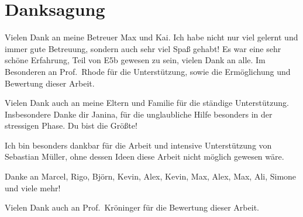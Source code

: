 \thispagestyle{empty}
\section*{\color{tugreen}Danksagung}
%
Vielen Dank an meine Betreuer Max und Kai. Ich habe nicht nur viel gelernt und immer gute Betreuung,
sondern auch sehr viel Spaß gehabt! Es war eine sehr schöne Erfahrung, Teil von E5b gewesen zu sein,
vielen Dank an alle. Im Besonderen an Prof.~Rhode für die Unterstützung, sowie die Ermöglichung und
Bewertung dieser Arbeit.

Vielen Dank auch an meine Eltern und Familie für die ständige Unterstützung. Insbesondere Danke dir
Janina, für die unglaubliche Hilfe besonders in der stressigen Phase. Du bist die Größte!

Ich bin besonders dankbar für die Arbeit und intensive Unterstützung von Sebastian Müller, ohne
dessen Ideen diese Arbeit nicht möglich gewesen wäre.

Danke an Marcel, Rigo, Björn, Kevin, Alex, Kevin, Max, Alex, Max, Ali, Simone und viele mehr!

Vielen Dank auch an Prof.~Kröninger für die Bewertung dieser Arbeit.
